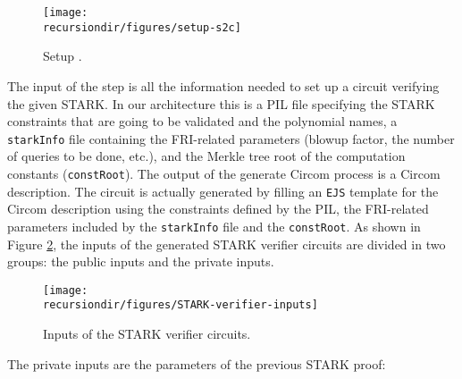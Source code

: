 \begin{figure}[H]
\centering
\texttt{[image: \\recursiondir/figures/setup-s2c]}
\caption{Setup \stoc.}
\label{fig:setup-p2c}
\end{figure}

The input of the \stoc step is all the information needed to set up a circuit verifying the given STARK. 
In our architecture this is a PIL file specifying the STARK constraints that are going to be validated and the polynomial names, a \texttt{starkInfo} file containing the FRI-related parameters (blowup factor, the number of queries to be done, etc.), 
and the Merkle tree root of the computation constants (\texttt{constRoot}).
The output of the generate Circom process is a Circom description. 
The circuit is actually generated by filling an  \texttt{EJS} template
for the Circom description using the constraints defined by the PIL, the FRI-related parameters included by the \texttt{starkInfo} file and the \texttt{constRoot}. 
As shown in Figure \ref{fig:stark-verifier-circuit}, the inputs of the generated STARK verifier circuits are divided in two groups: the public inputs and the private inputs.

\begin{figure}[H]
\centering
\texttt{[image: \\recursiondir/figures/STARK-verifier-inputs]}
\caption{Inputs of the STARK verifier circuits.}
\label{fig:stark-verifier-circuit}
\end{figure}

The private inputs are the parameters of the previous STARK proof:


